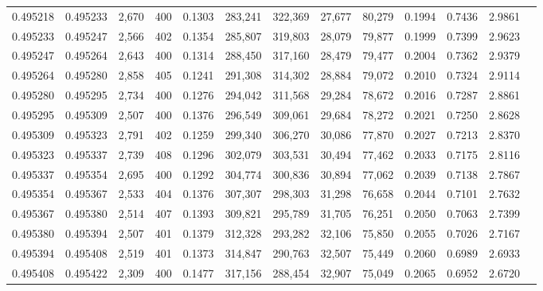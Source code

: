 \begin{tabular}{rrrrrrrrrrrrr}
0.495218 & 0.495233 & 2,670 & 400 &                                     0.1303 & 283,241 & 322,369 &  27,677 &  80,279 & 0.1994 & 0.7436 & 2.9861 \\
0.495233 & 0.495247 & 2,566 & 402 &                                     0.1354 & 285,807 & 319,803 &  28,079 &  79,877 & 0.1999 & 0.7399 & 2.9623 \\
0.495247 & 0.495264 & 2,643 & 400 &                                     0.1314 & 288,450 & 317,160 &  28,479 &  79,477 & 0.2004 & 0.7362 & 2.9379 \\
0.495264 & 0.495280 & 2,858 & 405 &                                     0.1241 & 291,308 & 314,302 &  28,884 &  79,072 & 0.2010 & 0.7324 & 2.9114 \\
0.495280 & 0.495295 & 2,734 & 400 &                                     0.1276 & 294,042 & 311,568 &  29,284 &  78,672 & 0.2016 & 0.7287 & 2.8861 \\
0.495295 & 0.495309 & 2,507 & 400 &                                     0.1376 & 296,549 & 309,061 &  29,684 &  78,272 & 0.2021 & 0.7250 & 2.8628 \\
0.495309 & 0.495323 & 2,791 & 402 &                                     0.1259 & 299,340 & 306,270 &  30,086 &  77,870 & 0.2027 & 0.7213 & 2.8370 \\
0.495323 & 0.495337 & 2,739 & 408 &                                     0.1296 & 302,079 & 303,531 &  30,494 &  77,462 & 0.2033 & 0.7175 & 2.8116 \\
0.495337 & 0.495354 & 2,695 & 400 &                                     0.1292 & 304,774 & 300,836 &  30,894 &  77,062 & 0.2039 & 0.7138 & 2.7867 \\
0.495354 & 0.495367 & 2,533 & 404 &                                     0.1376 & 307,307 & 298,303 &  31,298 &  76,658 & 0.2044 & 0.7101 & 2.7632 \\
0.495367 & 0.495380 & 2,514 & 407 &                                     0.1393 & 309,821 & 295,789 &  31,705 &  76,251 & 0.2050 & 0.7063 & 2.7399 \\
0.495380 & 0.495394 & 2,507 & 401 &                                     0.1379 & 312,328 & 293,282 &  32,106 &  75,850 & 0.2055 & 0.7026 & 2.7167 \\
0.495394 & 0.495408 & 2,519 & 401 &                                     0.1373 & 314,847 & 290,763 &  32,507 &  75,449 & 0.2060 & 0.6989 & 2.6933 \\
0.495408 & 0.495422 & 2,309 & 400 &                                     0.1477 & 317,156 & 288,454 &  32,907 &  75,049 & 0.2065 & 0.6952 & 2.6720 \\

\end{tabular}
